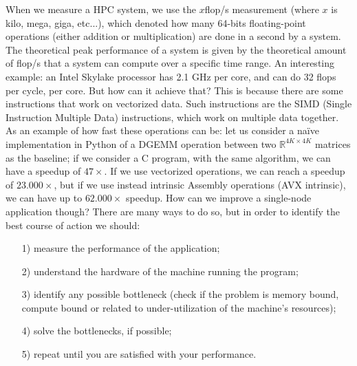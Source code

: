 When we measure a HPC system, we use the $x$flop/s measurement (where $x$ is kilo, mega, giga, etc...), which denoted how many 64-bits floating-point operations (either addition or multiplication) are done in a second by a system. The theoretical peak performance of a system is given by the theoretical amount of flop/s that a system can compute over a specific time range.
\nwl
An interesting example: an Intel Skylake processor has 2.1 GHz per core, and can do 32 flops per cycle, per core. But how can it achieve that? This is because there are some instructions that work on vectorized data. Such instructions are the SIMD (Single Instruction Multiple Data) instructions, which work on multiple data together.
\nwl
As an example of how fast these operations can be: let us consider a naïve implementation in Python of a DGEMM operation between two $\mathbb{R}^{4K \times 4K}$ matrices as the baseline; if we consider a C program, with the same algorithm, we can have a speedup of $47\times$. If we use vectorized operations, we can reach a speedup of $23.000\times$, but if we use instead intrinsic Assembly operations (AVX intrinsic), we can have up to $62.000 \times$ speedup.
\nwl
How can we improve a single-node application though? There are many ways to do so, but in order to identify the best course of action we should:
\begin{itemize}
    \item [1)] measure the performance of the application;
    \item [2)] understand the hardware of the machine running the program;
    \item [3)] identify any possible bottleneck (check if the problem is memory bound, compute bound or related to under-utilization of the machine's resources);
    \item [4)] solve the bottlenecks, if possible;
    \item [5)] repeat until you are satisfied with your performance.
\end{itemize}

